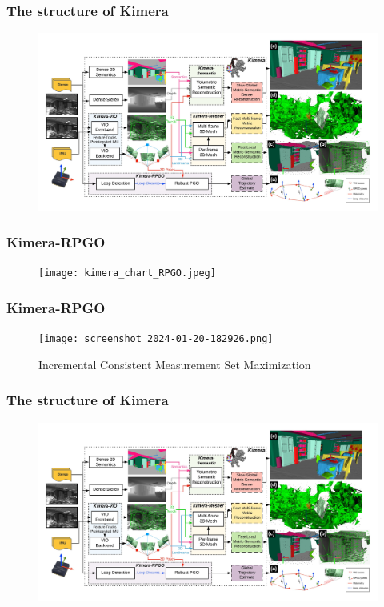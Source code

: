 \documentclass[11pt]{beamer}
\begin{document}
\begin{frame}
\frametitle{The structure of Kimera}
\begin{figure}
    \includegraphics[width=\linewidth]{kimera_chart_23.jpeg} 
\end{figure}
\end{frame}
\begin{frame}
    \frametitle{Kimera-RPGO} 
\begin{figure}
    \texttt{[image: kimera\_chart\_RPGO.jpeg]} 
\end{figure}
\end{frame}
\begin{frame}
    \frametitle{Kimera-RPGO} 
\begin{figure}
    \texttt{[image: screenshot\_2024-01-20-182926.png]} 
    \caption{Incremental
    Consistent Measurement Set Maximization \cite{PCM}}
\end{figure}
\end{frame}
\begin{frame}
\frametitle{The structure of Kimera}
\begin{figure}
    \includegraphics[width=\linewidth]{kimera_chart_23.jpeg} 
\end{figure}
\end{frame}
\end{document}
